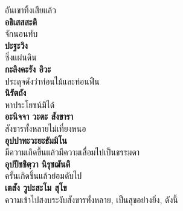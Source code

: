 \documentclass[12pt]{article}
\begin{document}
\indent อันเขาทิ้งเสียแล้ว\\
\textbf{อธิเสสสะติ\\}
\indent จักนอนทับ\\
\textbf{ปะฐะวิง\\}
\indent ซึ่งแผ่นดิน\\
\textbf{กะลิงคะรัง อิวะ\\}
\indent ประดุจดังว่าท่อนไม้และท่อนฟืน\\
\textbf{นิรัตถัง\\}
\indent หาประโยชน์มิได้\\
\textbf{อะนิจจา วะตะ สังขารา\\}
\indent สังขารทั้งหลายไม่เที่ยงหนอ\\
\textbf{อุปปาทะวะยะธัมมิโน\\}
\indent มีความเกิดขึ้นแล้วมีความเสื่อมไปเป็นธรรมดา\\
\textbf{อุปปัชชิตฺวา นิรุชฌันติ\\}
\indent ครั้นเกิดขึ้นแล้วย่อมดับไป\\
\textbf{เตสัง วูปะสะโม สุโข\\}
\indent ความเข้าไปสงบระงับสังขารทั้งหลาย, เป็นสุขอย่างยิ่ง, ดังนี้\\

\pagebreak
\end{document}

